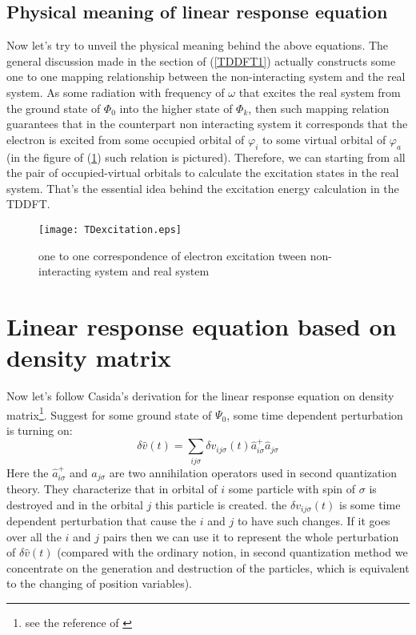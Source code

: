 \subsection{Physical meaning of linear response equation}
%
%
%
%
Now let's try to unveil the physical meaning behind the
above equations. The general discussion
made in the section of (\ref{TDDFT1}) actually constructs some one
to one mapping relationship between the non-interacting system and
the real system. As some radiation with frequency of $\omega$ that
excites the real system from the ground state of $\Phi_{0}$ into the
higher state of $\Phi_{k}$, then such mapping relation guarantees
that in the counterpart non interacting system it corresponds that
the electron is excited from some occupied orbital of $\varphi_{i}$
to some virtual orbital of $\varphi_{a}$ (in the figure of
(\ref{TDDFT:2}) such relation is pictured). Therefore, we can
starting from all the pair of occupied-virtual orbitals to calculate
the excitation states in the real system. That's the essential idea
behind the excitation energy calculation in the TDDFT.
\begin{figure}[htp]
\begin{center}
\texttt{[image: TDexcitation.eps]}
\caption{one to one correspondence  of electron excitation tween
non-interacting system and real system}\label{TDDFT:2}
\end{center}
\end{figure}



\section{Linear response equation based on density matrix}
%
%
%
%
Now let's follow Casida's derivation for the linear response equation
on density matrix\footnote{see the reference of \cite{Casida1}}.
Suggest for some ground state of $\Psi_{0}$, some time dependent
perturbation is turning on:
\begin{equation}
 \label{TDDFT_Casida:1}
\delta \hat{v} (t) = \sum_{ij\sigma} \delta
v_{ij\sigma}(t)\hat{a}^{+}_{i\sigma}\hat{a}_{j\sigma} 
\end{equation} 
Here the $\hat{a}^{+}_{i\sigma}$ and $\hat{a}_{j\sigma}$ are two
annihilation operators used in second quantization theory. They
characterize that in orbital of $i$ some particle with spin of
$\sigma$ is destroyed and in the orbital $j$ this particle is
created. the $\delta v_{ij\sigma}(t)$ is some time dependent
perturbation that cause the $i$ and $j$ to have such changes. If it
goes over all the $i$ and $j$ pairs then we can use it to represent
the whole perturbation of $\delta \hat{v} (t)$ (compared with the
ordinary notion, in second quantization method we concentrate on the
generation and destruction of the particles, which is equivalent to
the changing of position variables).

